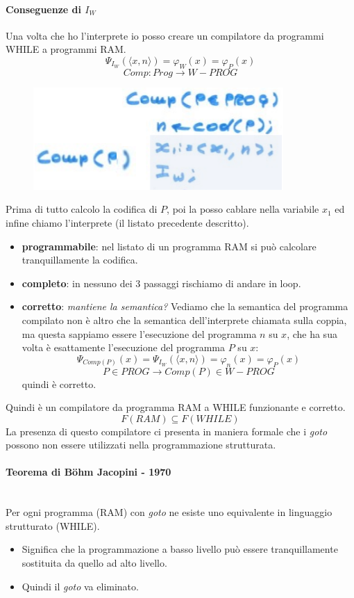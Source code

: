 \documentclass{article}
\begin{document}
\paragraph{Conseguenze di $I_W$}
Una volta che ho l'interprete io posso creare un compilatore da programmi WHILE a programmi RAM.
$$\Psi_{I_W}\left(\langle x,n\rangle\right)=\varphi_W(x)=\varphi_P(x)$$
$$Comp:Prog\rightarrow W-PROG$$
\begin{figure}[H]
    \centering
    \includegraphics[scale=0.6]{images/compi_Iw.png}
\end{figure}
Prima di tutto calcolo la codifica di $P$, poi la posso cablare nella variabile $x_1$
ed infine chiamo l'interprete (il listato precedente descritto).
\begin{itemize}
    \item \textbf{programmabile}: nel listato di un programma RAM si può calcolare
          tranquillamente la codifica.
    \item \textbf{completo}: in nessuno dei 3 passaggi rischiamo di andare in loop.
    \item \textbf{corretto}: \textit{mantiene la semantica?} Vediamo che la semantica
          del programma compilato non è altro che la semantica dell'interprete chiamata
          sulla coppia, ma questa sappiamo essere l'esecuzione del programma $n$ su $x$, che
          ha sua volta è esattamente l'esecuzione del programma $P$ su $x$:
          $$\Psi_{Comp(P)}(x)=\Psi_{I_W}\left(\langle x,n\rangle\right)=\varphi_n (x)=\varphi_P (x)$$
          $$P\in PROG\rightarrow Comp(P)\in W-PROG$$
          quindi è corretto.
\end{itemize}
Quindi è un compilatore da programma RAM a WHILE funzionante e corretto.
$$F(RAM)\subseteq F(WHILE)$$
La presenza di questo compilatore ci presenta in maniera formale che i \textit{goto}
possono non essere utilizzati nella programmazione strutturata.
\paragraph{Teorema di Böhm Jacopini - 1970}\mbox{}\\
Per ogni programma (RAM) con \textit{goto} ne esiste uno equivalente in linguaggio
strutturato (WHILE).
\begin{itemize}
    \item Significa che la programmazione a basso livello può essere tranquillamente
          sostituita da quello ad alto livello.
    \item Quindi il \textit{goto} va eliminato.
\end{itemize}
\end{document}
